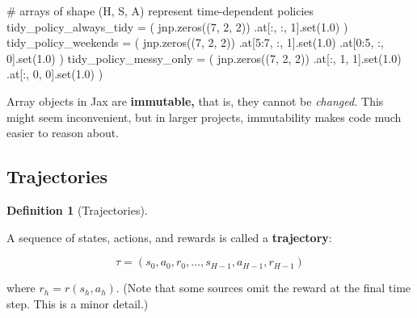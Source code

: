\documentclass[
  letterpaper,
  DIV=11,
  numbers=noendperiod]{scrreprt}
\newenvironment{Shaded}{\begin{snugshade}}{\end{snugshade}}
\newcommand{\BuiltInTok}[1]{\textcolor[rgb]{0.00,0.23,0.31}{#1}}
\newcommand{\CommentTok}[1]{\textcolor[rgb]{0.37,0.37,0.37}{#1}}
\newcommand{\DecValTok}[1]{\textcolor[rgb]{0.68,0.00,0.00}{#1}}
\newcommand{\FloatTok}[1]{\textcolor[rgb]{0.68,0.00,0.00}{#1}}
\newcommand{\NormalTok}[1]{\textcolor[rgb]{0.00,0.23,0.31}{#1}}
\newcommand{\OperatorTok}[1]{\textcolor[rgb]{0.37,0.37,0.37}{#1}}
\theoremstyle{plain}
\theoremstyle{plain}
\theoremstyle{definition}
\theoremstyle{definition}
\newtheorem{definition}{Definition}[chapter]
\theoremstyle{remark}
\begin{document}
\begin{Shaded}
\begin{Highlighting}[]
\CommentTok{\# arrays of shape (H, S, A) represent time{-}dependent policies}
\NormalTok{tidy\_policy\_always\_tidy }\OperatorTok{=}\NormalTok{ (}
\NormalTok{    jnp.zeros((}\DecValTok{7}\NormalTok{, }\DecValTok{2}\NormalTok{, }\DecValTok{2}\NormalTok{))}
\NormalTok{    .at[:, :, }\DecValTok{1}\NormalTok{].}\BuiltInTok{set}\NormalTok{(}\FloatTok{1.0}\NormalTok{)}
\NormalTok{)}
\NormalTok{tidy\_policy\_weekends }\OperatorTok{=}\NormalTok{ (}
\NormalTok{    jnp.zeros((}\DecValTok{7}\NormalTok{, }\DecValTok{2}\NormalTok{, }\DecValTok{2}\NormalTok{))}
\NormalTok{    .at[}\DecValTok{5}\NormalTok{:}\DecValTok{7}\NormalTok{, :, }\DecValTok{1}\NormalTok{].}\BuiltInTok{set}\NormalTok{(}\FloatTok{1.0}\NormalTok{)}
\NormalTok{    .at[}\DecValTok{0}\NormalTok{:}\DecValTok{5}\NormalTok{, :, }\DecValTok{0}\NormalTok{].}\BuiltInTok{set}\NormalTok{(}\FloatTok{1.0}\NormalTok{)}
\NormalTok{)}
\NormalTok{tidy\_policy\_messy\_only }\OperatorTok{=}\NormalTok{ (}
\NormalTok{    jnp.zeros((}\DecValTok{7}\NormalTok{, }\DecValTok{2}\NormalTok{, }\DecValTok{2}\NormalTok{))}
\NormalTok{    .at[:, }\DecValTok{1}\NormalTok{, }\DecValTok{1}\NormalTok{].}\BuiltInTok{set}\NormalTok{(}\FloatTok{1.0}\NormalTok{)}
\NormalTok{    .at[:, }\DecValTok{0}\NormalTok{, }\DecValTok{0}\NormalTok{].}\BuiltInTok{set}\NormalTok{(}\FloatTok{1.0}\NormalTok{)}
\NormalTok{)}
\end{Highlighting}
\end{Shaded}

Array objects in Jax are \textbf{immutable,} that is, they cannot be
\emph{changed.} This might seem inconvenient, but in larger projects,
immutability makes code much easier to reason about.

\subsection{Trajectories}\label{sec-trajectories}

\begin{definition}[Trajectories]\protect\hypertarget{def-trajectory}{}\label{def-trajectory}

A sequence of states, actions, and rewards is called a
\textbf{trajectory}:

\[\tau = (s_0, a_0, r_0, \dots, s_{H-1}, a_{H-1}, r_{H-1})\]

where \(r_h= r(s_h, a_h)\). (Note that some sources omit the reward at
the final time step. This is a minor detail.)

\end{definition}
\end{document}

